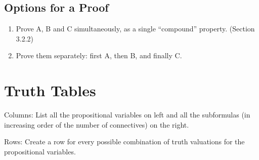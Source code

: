 \documentclass{article}
\begin{document}
\subsection{Options for a Proof}

\begin{enumerate}
\item Prove A, B and C simultaneously, as a single “compound”
property. (Section 3.2.2)
\item Prove them separately: first A, then B, and finally C.
\end{enumerate}

\section{Truth Tables}
Columns: List all the propositional variables on left and all the
subformulas (in increasing order of the number of connectives) on
the right.

Rows: Create a row for every possible combination of truth
valuations for the propositional variables.
\end{document}
